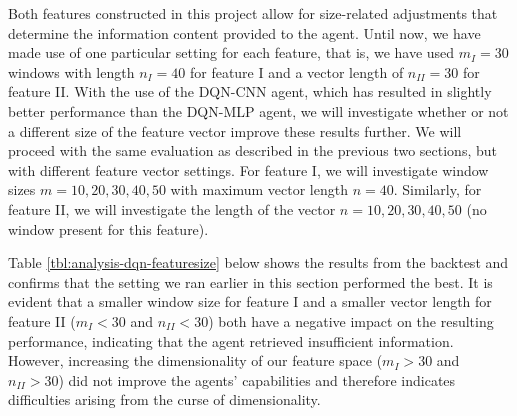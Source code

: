 Both features constructed in this project allow for size-related adjustments that determine the information content provided to the agent.
Until now, we have made use of one particular setting for each feature, that is, we have used $m_I=30$ windows with length $n_I=40$ for feature I and a vector length of $n_{II}=30$ for feature II.
With the use of the DQN-CNN agent, which has resulted in slightly better performance than the DQN-MLP agent, we will investigate whether or not a different size of the feature vector improve these results further.
We will proceed with the same evaluation as described in the previous two sections, but with different feature vector settings.
For feature I, we will investigate window sizes $m=10,20,30,40,50$ with maximum vector length $n=40$.
Similarly, for feature II, we will investigate the length of the vector $n=10,20,30,40,50$ (no window present for this feature).

Table \ref{tbl:analysis-dqn-featuresize} below shows the results from the backtest and confirms that the setting we ran earlier in this section performed the best.
It is evident that a smaller window size for feature I and a smaller vector length for feature II ($m_I<30$ and $n_{II}<30$) both have a negative impact on the resulting performance, indicating that the agent retrieved insufficient information.
However, increasing the dimensionality of our feature space ($m_I>30$ and $n_{II}>30$) did not improve the agents' capabilities and therefore indicates difficulties arising from the curse of dimensionality\cite{keogh2011curse}.

